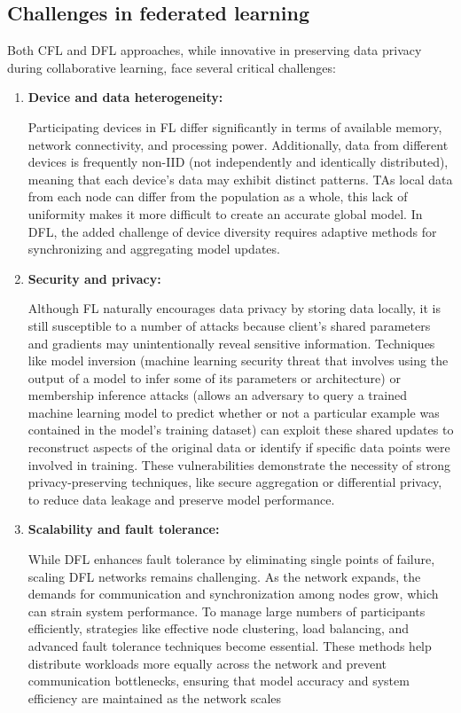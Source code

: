 \subsection{Challenges in federated learning}
\label{sub:challenges_in_fl}

Both CFL and DFL approaches, while innovative in preserving data privacy during collaborative learning, face several critical challenges:

\begin{enumerate}
	\item \textbf{Device and data heterogeneity:}
	
	Participating devices in FL differ significantly in terms of available memory, network connectivity, and processing power. Additionally, data from different devices is frequently non-IID (not independently and identically distributed), meaning that each device's data may exhibit distinct patterns. TAs local data from each node can differ from the population as a whole, this lack of uniformity makes it more difficult to create an accurate global model. In DFL, the added challenge of device diversity requires adaptive methods for synchronizing and aggregating model updates. ​
	\item \textbf{Security and privacy:}
	
	Although FL naturally encourages data privacy by storing data locally, it is still susceptible to a number of attacks because client’s shared parameters and gradients may unintentionally reveal sensitive information. Techniques like model inversion (machine learning security threat that involves using the output of a model to infer some of its parameters or architecture) or membership inference attacks (allows an adversary to query a trained machine learning model to predict whether or not a particular example was contained in the model's training dataset) can exploit these shared updates to reconstruct aspects of the original data or identify if specific data points were involved in training. These vulnerabilities demonstrate the necessity of strong privacy-preserving techniques, like secure aggregation or differential privacy, to reduce data leakage and preserve model performance.
	\item \textbf{Scalability and fault tolerance:} 
	
	While DFL enhances fault tolerance by eliminating single points of failure, scaling DFL networks remains challenging. As the network expands, the demands for communication and synchronization among nodes grow, which can strain system performance. To manage large numbers of participants efficiently, strategies like effective node clustering, load balancing, and advanced fault tolerance techniques become essential. These methods help distribute workloads more equally across the network and prevent communication bottlenecks, ensuring that model accuracy and system efficiency are maintained as the network scales

\end{enumerate}

